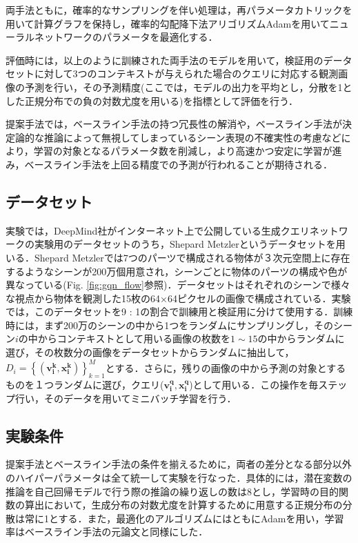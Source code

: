 両手法ともに，確率的なサンプリングを伴い処理は，再パラメータカトリックを用いて計算グラフを保持し，確率的勾配降下法アリゴリズムAdam\cite{Kingma2014}を用いてニューラルネットワークのパラメータを最適化する．

評価時には，以上のように訓練された両手法のモデルを用いて，検証用のデータセットに対して3つのコンテキストが与えられた場合のクエリに対応する観測画像の予測を行い，その予測精度(ここでは，モデルの出力を平均とし，分散を1とした正規分布での負の対数尤度を用いる)を指標として評価を行う．

提案手法では，ベースライン手法の持つ冗長性の解消や，ベースライン手法が決定論的な推論によって無視してしまっているシーン表現の不確実性の考慮などにより，学習の対象となるパラメータ数を削減し，より高速かつ安定に学習が進み，ベースライン手法を上回る精度での予測が行われることが期待される．

\subsection{データセット}
実験では，DeepMind社がインターネット上で公開している生成クエリネットワークの実験用のデータセット\cite{gqn_dataset}のうち，Shepard Metzlerというデータセットを用いる．Shepard Metzlerでは7つのパーツで構成される物体が３次元空間上に存在するようなシーンが200万個用意され，シーンごとに物体のパーツの構成や色が異なっている(Fig. \ref{fig:gqn_flow}参照)．データセットはそれぞれのシーンで様々な視点から物体を観測した15枚の64×64ピクセルの画像で構成されている．実験では，このデータセットを9 : 1の割合で訓練用と検証用に分けて使用する．訓練時には，まず200万のシーンの中から1つをランダムにサンプリングし，そのシーン$i$の中からコンテキストとして用いる画像の枚数を$1 \sim 15$の中からランダムに選び，その枚数分の画像をデータセットからランダムに抽出して，$D_i = \left\{ \left( \bm{v _ { i } ^ { k }} , \bm{x _ { i } ^ { k }} \right) \right\} _ { k = 1 } ^ { M }$とする．さらに，残りの画像の中から予測の対象とするものを１つランダムに選び，クエリ($\bm{v_i^q}, \bm{x_i^q}$)として用いる．この操作を毎ステップ行い，そのデータを用いてミニバッチ学習を行う．

\subsection{実験条件}
提案手法とベースライン手法の条件を揃えるために，両者の差分となる部分以外のハイパーパラメータは全て統一して実験を行なった．具体的には，潜在変数の推論を自己回帰モデルで行う際の推論の繰り返しの数は8とし，学習時の目的関数の算出において，生成分布の対数尤度を計算するために用意する正規分布の分散は常に1とする．また，最適化のアルゴリズムにはともにAdam\cite{Kingma2014}を用い，学習率はベースライン手法の元論文\cite{Eslami2018}と同様にした．

